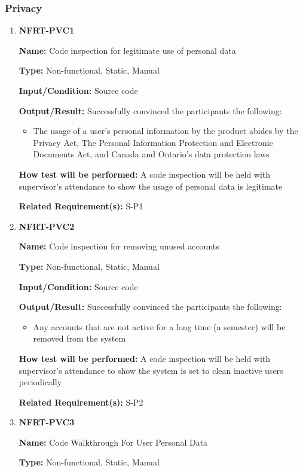 \documentclass[12pt, titlepage]{article}
\begin{document}
\subsubsection{Privacy}
\begin{enumerate}
\item{\textbf{NFRT-PVC1}}

\textbf{Name:} Code inspection for legitimate use of personal data

\textbf{Type:} Non-functional, Static, Manual

\textbf{Input/Condition:} Source code

\textbf{Output/Result:} Successfully convinced the participants the following:
\begin{itemize}
\item The usage of a user's personal information by the product abides by the Privacy Act, The Personal Information Protection and Electronic Documents Act, and Canada and Ontario's data protection laws
\end{itemize}

\textbf{How test will be performed:} A code inspection will be held with supervisor's attendance to show the usage of personal data is legitimate

\textbf{Related Requirement(s):} S-P1

\item{\textbf{NFRT-PVC2}}

\textbf{Name:} Code inspection for removing unused accounts

\textbf{Type:} Non-functional, Static, Manual

\textbf{Input/Condition:} Source code

\textbf{Output/Result:} Successfully convinced the participants the following:
\begin{itemize}
\item Any accounts that are not active for a long time (a semester) will be removed from the system
\end{itemize}

\textbf{How test will be performed:} A code inspection will be held with supervisor's attendance to show the system is set to clean inactive users periodically

\textbf{Related Requirement(s):} S-P2

\item{\textbf{NFRT-PVC3}}

\textbf{Name:} Code Walkthrough For User Personal Data

\textbf{Type:} Non-functional, Static, Manual


\end{enumerate}
\end{document}
